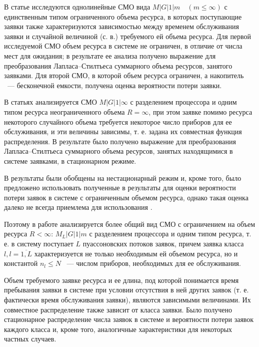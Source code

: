 \documentclass[a4paper,12pt]{article}
\begin{document}
В статье \cite{Tihonenko_24_1990} исследуются однолинейные СМО вида $M|G|1|m \quad (m\leq\infty)$ с единственным типом ограниченного объема ресурса, в которых поступающие заявки также характеризуются зависимостью между временем обслуживания заявки и случайной величиной (с. в.) требуемого ей объема ресурса. Для первой исследуемой СМО объем ресурса в системе не ограничен, в отличие от числа мест для ожидания; в результате ее анализа получено выражение для преобразования Лапласа--Стилтьеса суммарного объема ресурсов, занятого заявками. Для второй СМО, в которой объем ресурса ограничен, а накопитель ~--- бесконечной емкости, получена оценка вероятности потери заявки.



В статьях \cite{Sengupta,Tihonenko_40_2002} анализируется СМО $M|G|1|\infty$ с разделением процессора и одним типом ресурса неограниченного объема $R=\infty$, при этом заявке помимо ресурса некоторого случайного объема требуется некоторое число приборов для ее обслуживания, и эти величины зависимы, т. е. задана их совместная функция распределения. В результате было получено выражение для преобразования Лапласа--Стилтьеса суммарного объема ресурсов, занятых находящимися в системе заявками, в стационарном режиме.

В \cite{Tihonenko_40_2002} результаты были обобщены на нестационарный режим и, кроме того, было предложено использовать полученные в \cite{Sengupta} результаты для оценки вероятности потери заявок в системе с ограниченным объемом ресурса, однако такая оценка далеко не всегда приемлема для использования \cite{Tihonenko_40_2002}.

Поэтому в работе \cite{Tihonenko_25_2010} анализируется более общий вид СМО с ограничением на объем ресурса $R<\infty$: $M_{L}|G|1|m$ с разделением процессора и одним типом ресурса, т. е. в систему поступает $L$ пуассоновских потоков заявок, причем заявка класса $l, l=\overline{1,L}$ характеризуется не только необходимым ей объемом ресурса, но и константой $n_l\leq N$ ~--- числом приборов, необходимых для ее обслуживания.

Объем требуемого заявке ресурса и ее длина, под которой понимается время пребывания заявки в системе при условии отсутствия в ней других заявок (т. е. фактически время обслуживания заявки), являются зависимыми величинами. Их совместное распределение также зависит от класса заявки. Было получено стационарное распределение числа заявок в системе и вероятности потери заявок каждого класса и, кроме того,  аналогичные характеристики для некоторых частных случаев.
\end{document}
